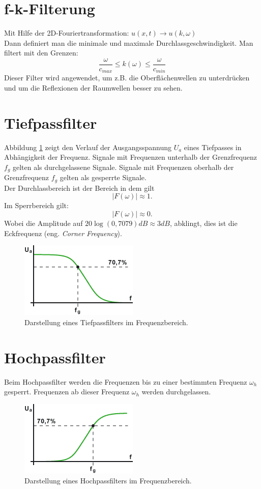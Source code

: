 \section{f-k-Filterung}
Mit Hilfe der 2D-Fouriertransformation: $u(x,t)\longrightarrow u(k,\omega)$\\
Dann definiert man die minimale und maximale Durchlassgeschwindigkeit. Man filtert mit den Grenzen: \\
\begin{equation*}
\dfrac{\omega}{c_{max}}\leq k(\omega)\leq \frac{\omega}{c_{min}}
\end{equation*}
Dieser Filter wird angewendet, um z.B. die Oberflächenwellen zu unterdrücken und um die Reflexionen der Raumwellen besser zu sehen.

\section{Tiefpassfilter}
Abbildung \ref{fig:filt_tiefpass} zeigt den Verlauf der Ausgangsspannung $U_a$ eines Tiefpasses in Abhängigkeit der Frequenz. Signale mit Frequenzen unterhalb der Grenzfrequenz $f_g$ gelten als durchgelassene Signale. Signale mit Frequenzen oberhalb der Grenzfrequenz $f_g$ gelten als gesperrte Signale.\\
Der Durchlassbereich ist der Bereich in dem gilt
\[
\vert F(\omega) \vert \approx 1.
\]
Im Sperrbereich gilt:
\[
\vert F(\omega) \vert \approx 0.
\]
Wobei die Amplitude auf $20 \log (0,7079)dB \approx 3dB$,  abklingt, dies ist die Eckfrequenz (eng. \textsl{Corner Frequency}).
\begin{figure}[h!]
\centering
\includegraphics[width=.4\tw]{fig/06-Filter/tiefpass.png}
\caption{Darstellung eines Tiefpassfilters im Frequenzbereich.}
\label{fig:filt_tiefpass}
\end{figure}

\section{Hochpassfilter}
Beim Hochpassfilter werden die Frequenzen bis zu einer bestimmten Frequenz $\omega_{h}$  gesperrt. Frequenzen ab dieser Frequenz $\omega_{h}$ werden durchgelassen.
\begin{figure}[h!]
\centering
\includegraphics[width=.4\tw]{fig/06-Filter/hochpass.png}
\caption{Darstellung eines Hochpassfilters im Frequenzbereich.}
\end{figure}

